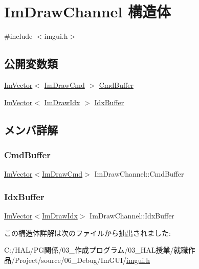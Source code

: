 \hypertarget{struct_im_draw_channel}{}\section{Im\+Draw\+Channel 構造体}
\label{struct_im_draw_channel}


{\ttfamily \#include $<$imgui.\+h$>$}

\subsection*{公開変数類}
\begin{DoxyCompactItemize}
\item 
\mbox{\hyperlink{class_im_vector}{Im\+Vector}}$<$ \mbox{\hyperlink{struct_im_draw_cmd}{Im\+Draw\+Cmd}} $>$ \mbox{\hyperlink{struct_im_draw_channel_abdaa17053d55fb6757c1971d410ceddf}{Cmd\+Buffer}}
\item 
\mbox{\hyperlink{class_im_vector}{Im\+Vector}}$<$ \mbox{\hyperlink{imgui_8h_afdc8744a5ac1a968b1ddfa47e13b2fa1}{Im\+Draw\+Idx}} $>$ \mbox{\hyperlink{struct_im_draw_channel_a7fbed7d3523124fadd94859d5ac0fd67}{Idx\+Buffer}}
\end{DoxyCompactItemize}


\subsection{メンバ詳解}
\mbox{\label{struct_im_draw_channel_abdaa17053d55fb6757c1971d410ceddf}} 
\subsubsection{\texorpdfstring{Cmd\+Buffer}{CmdBuffer}}
{\footnotesize\ttfamily \mbox{\hyperlink{class_im_vector}{Im\+Vector}}$<$\mbox{\hyperlink{struct_im_draw_cmd}{Im\+Draw\+Cmd}}$>$ Im\+Draw\+Channel\+::\+Cmd\+Buffer}

\mbox{\label{struct_im_draw_channel_a7fbed7d3523124fadd94859d5ac0fd67}} 
\subsubsection{\texorpdfstring{Idx\+Buffer}{IdxBuffer}}
{\footnotesize\ttfamily \mbox{\hyperlink{class_im_vector}{Im\+Vector}}$<$\mbox{\hyperlink{imgui_8h_afdc8744a5ac1a968b1ddfa47e13b2fa1}{Im\+Draw\+Idx}}$>$ Im\+Draw\+Channel\+::\+Idx\+Buffer}



この構造体詳解は次のファイルから抽出されました\+:\begin{DoxyCompactItemize}
\item 
C\+:/\+H\+A\+L/\+P\+G関係/03\+\_\+作成プログラム/03\+\_\+\+H\+A\+L授業/就職作品/\+Project/source/06\+\_\+\+Debug/\+Im\+G\+U\+I/\mbox{\hyperlink{imgui_8h}{imgui.\+h}}\end{DoxyCompactItemize}
